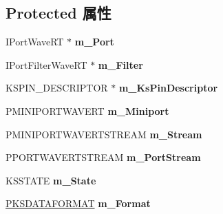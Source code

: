 \subsection*{Protected 属性}
\begin{DoxyCompactItemize}
\item 
\mbox{\label{class_c_port_pin_wave_r_t_ae510469ac7ee7be30ecd0d66a5f98b4a}} 
I\+Port\+Wave\+RT $\ast$ {\bfseries m\+\_\+\+Port}
\item 
\mbox{\label{class_c_port_pin_wave_r_t_a84a0aba5a1d7f7dd288eb5b84c31eff8}} 
I\+Port\+Filter\+Wave\+RT $\ast$ {\bfseries m\+\_\+\+Filter}
\item 
\mbox{\label{class_c_port_pin_wave_r_t_add715a24370eb30aabd87b0e01079e79}} 
K\+S\+P\+I\+N\+\_\+\+D\+E\+S\+C\+R\+I\+P\+T\+OR $\ast$ {\bfseries m\+\_\+\+Ks\+Pin\+Descriptor}
\item 
\mbox{\label{class_c_port_pin_wave_r_t_a2fadd7be87f12f377f4ea7ee6016008c}} 
P\+M\+I\+N\+I\+P\+O\+R\+T\+W\+A\+V\+E\+RT {\bfseries m\+\_\+\+Miniport}
\item 
\mbox{\label{class_c_port_pin_wave_r_t_a3e2e75f67b150bda41e96d52b21f0ae2}} 
P\+M\+I\+N\+I\+P\+O\+R\+T\+W\+A\+V\+E\+R\+T\+S\+T\+R\+E\+AM {\bfseries m\+\_\+\+Stream}
\item 
\mbox{\label{class_c_port_pin_wave_r_t_a8cd1154ca95cf91782a9a191f5634b51}} 
P\+P\+O\+R\+T\+W\+A\+V\+E\+R\+T\+S\+T\+R\+E\+AM {\bfseries m\+\_\+\+Port\+Stream}
\item 
\mbox{\label{class_c_port_pin_wave_r_t_a06c50d5c3d3ef0046668c47e79e542bc}} 
K\+S\+S\+T\+A\+TE {\bfseries m\+\_\+\+State}
\item 
\mbox{\label{class_c_port_pin_wave_r_t_ae300c4c735323a15c1baace64f40ec6b}} 
\hyperlink{struct_k_s_d_a_t_a_f_o_r_m_a_t}{P\+K\+S\+D\+A\+T\+A\+F\+O\+R\+M\+AT} {\bfseries m\+\_\+\+Format}
\item 
\mbox{\label{class_c_port_pin_wave_r_t_ae654601637d328f7c0f3fa82c4a99c23}} 

\end{DoxyCompactItemize}

